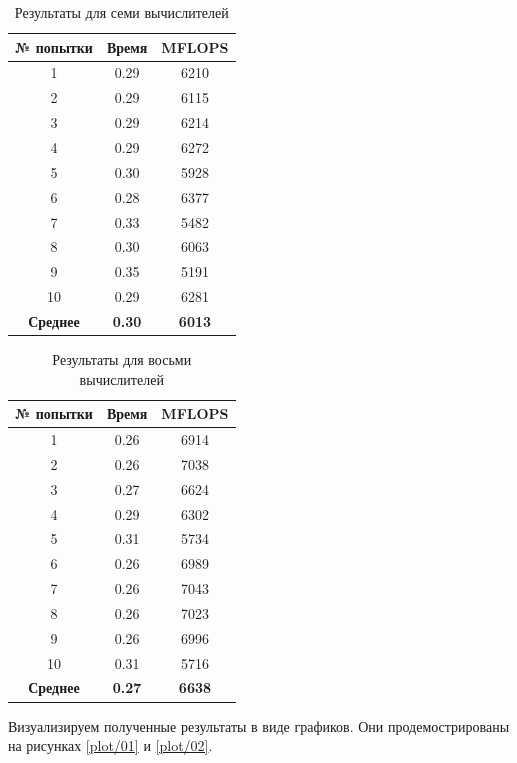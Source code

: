 \begin{table}[H]
	\caption{Результаты для семи вычислителей}
	\centering
	\begin{tabular}{|c|c|c|}
		\hline
		\textbf{№ попытки} & \textbf{Время} & \textbf{MFLOPS} \\\hline
		1 & 0.29 & 6210 \\ \hline
		2 & 0.29 & 6115 \\ \hline
		3 & 0.29 & 6214 \\ \hline
		4 & 0.29 & 6272 \\ \hline
		5 & 0.30 & 5928 \\ \hline
		6 & 0.28 & 6377 \\ \hline
		7 & 0.33 & 5482 \\ \hline
		8 & 0.30 & 6063 \\ \hline
		9 & 0.35 & 5191 \\ \hline
		10 & 0.29 & 6281 \\ \hline
		\textbf{Среднее} & \textbf{0.30} & \textbf{6013} \\\hline
	\end{tabular}
	\label{res/07}
\end{table}


\begin{table}[H]
	\caption{Результаты для восьми вычислителей}
	\centering
	\begin{tabular}{|c|c|c|}
		\hline
		\textbf{№ попытки} & \textbf{Время} & \textbf{MFLOPS} \\\hline
		1 & 0.26 & 6914 \\ \hline
		2 & 0.26 & 7038 \\ \hline
		3 & 0.27 & 6624 \\ \hline
		4 & 0.29 & 6302 \\ \hline
		5 & 0.31 & 5734 \\ \hline
		6 & 0.26 & 6989 \\ \hline
		7 & 0.26 & 7043 \\ \hline
		8 & 0.26 & 7023 \\ \hline
		9 & 0.26 & 6996 \\ \hline
		10 & 0.31 & 5716 \\ \hline
		\textbf{Среднее} & \textbf{0.27} & \textbf{6638} \\\hline
	\end{tabular}
	\label{res/08}
\end{table}


Визуализируем полученные результаты в виде графиков. Они продемострированы на рисунках \ref{plot/01} и \ref{plot/02}.


